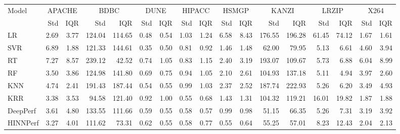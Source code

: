 \begin{tabular}{lrrrrrrrrrrrrrrrr}
\toprule
Model & \multicolumn{2}{c}{APACHE} & \multicolumn{2}{c}{BDBC} & \multicolumn{2}{c}{DUNE} & \multicolumn{2}{c}{HIPACC} & \multicolumn{2}{c}{HSMGP} & \multicolumn{2}{c}{KANZI} & \multicolumn{2}{c}{LRZIP} & \multicolumn{2}{c}{X264} \\
 & Std & IQR & Std & IQR & Std & IQR & Std & IQR & Std & IQR & Std & IQR & Std & IQR & Std & IQR \\
\midrule
LR & 2.69 & 3.77 & 124.04 & 114.65 & 0.48 & 0.54 & 1.03 & 1.24 & 6.58 & 8.43 & 176.55 & 196.28 & 61.45 & 74.12 & 1.67 & 1.61 \\
SVR & 6.89 & 1.88 & 121.33 & 144.61 & 0.35 & 0.50 & 0.81 & 0.92 & 1.46 & 1.48 & 62.00 & 79.95 & 5.13 & 6.61 & 4.60 & 3.94 \\
RT & 7.27 & 8.57 & 239.12 & 42.52 & 0.74 & 1.05 & 0.83 & 1.15 & 2.40 & 3.19 & 193.07 & 109.67 & 5.73 & 6.88 & 6.04 & 8.99 \\
RF & 3.50 & 3.86 & 124.98 & 141.80 & 0.69 & 0.75 & 0.94 & 1.05 & 2.10 & 2.61 & 104.93 & 137.18 & 5.11 & 4.94 & 3.97 & 2.60 \\
KNN & 4.74 & 2.41 & 191.43 & 187.44 & 0.54 & 0.55 & 0.99 & 1.03 & 2.37 & 2.52 & 187.74 & 222.93 & 5.26 & 6.20 & 3.49 & 4.93 \\
KRR & 3.38 & 3.53 & 94.58 & 121.40 & 0.92 & 1.00 & 0.55 & 0.68 & 1.43 & 1.31 & 104.32 & 119.21 & 16.01 & 19.82 & 1.87 & 1.88 \\
DeepPerf & 3.61 & 4.80 & 133.55 & 111.66 & 0.59 & 0.55 & 0.58 & 0.57 & 0.99 & 0.98 & 51.15 & 66.35 & 5.26 & 7.31 & 3.19 & 3.92 \\
HINNPerf & 3.27 & 4.01 & 111.62 & 73.31 & 0.62 & 0.55 & 0.58 & 0.77 & 0.55 & 0.64 & 55.25 & 57.01 & 8.23 & 12.43 & 2.04 & 2.13 \\
\bottomrule
\end{tabular}
